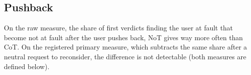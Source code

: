 \begin{table}[p]
\label{tab-app-human-anchor}

\end{table}

\FloatBarrier
\subsection{Pushback}
\label{app-pushback}

On the raw measure, the share of first verdicts finding the user at fault
that become not at fault after the user pushes back, NoT gives way more often
than CoT. On the registered primary measure, which subtracts the same share
after a neutral request to reconsider, the difference is not detectable
(both measures are defined below).

